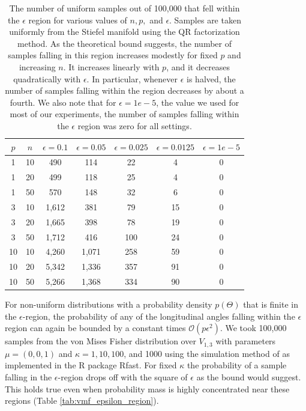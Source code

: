\documentclass[ba]{imsart}
\numberwithin{equation}{section}
\theoremstyle{plain}
\begin{document}
\begin{table}
\begin{tabular}{|cc||ccccc|}
\hline
$p$ & $n$  & $\epsilon = 0.1$ & $\epsilon = 0.05$ & $\epsilon = 0.025$ & $\epsilon = 0.0125$ & $\epsilon = 1e-5$\\
\hline
\hline
1 & 10 & 490 & 114 & 22 & 4 & 0\\
1 & 20 & 499 & 118 & 25 & 4 & 0\\
1 & 50 & 570 & 148 & 32 & 6 & 0 \\
\hline
3 & 10 & 1,612 & 381 & 79  & 15 & 0\\
3 & 20 & 1,665 & 398 & 78 & 19 & 0\\
3 & 50 & 1,712 & 416 & 100  & 24 & 0\\
\hline
10 & 10 & 4,260 & 1,071 & 258 & 59 & 0\\
10 & 20 & 5,342 & 1,336 & 357 & 91 & 0\\
10 & 50 & 5,266 & 1,368 & 334 & 90 & 0 \\
\hline
\end{tabular}
\caption{The number of uniform samples out of 100,000 that fell within the $\epsilon$ region for various values of $n, p,$ and $\epsilon$. Samples are taken uniformly from the Stiefel manifold using the QR factorization method. As the theoretical bound suggests, the number of samples falling in this region increases modestly for fixed $p$ and increasing $n$. It increases linearly with $p$, and it decreases quadratically with $\epsilon$. In particular, whenever $\epsilon$ is halved, the number of samples falling within the region decreases by about a fourth. We also note that for $\epsilon = 1e-5$, the value we used for most of our experiments, the number of samples falling within the $\epsilon$ region was zero for all settings.}
\label{tab:uniform_epsilon_region}
\end{table}

\noindent For non-uniform distributions with a probability density $p(\Theta)$ that is finite in the $\epsilon$-region, the probability of any of the longitudinal angles falling within the $\epsilon$ region can again be bounded by a constant times $\mathcal{O}(p \epsilon^2)$. We took 100,000 samples from the von Mises Fisher distribution over $V_{1,3}$ with parameters $\mu = (0,0,1)$ and $\kappa = 1, 10, 100$, and 1000 using the simulation method of \citet{wood1994simulation} as implemented in the R package Rfast. For fixed $\kappa$ the probability of a sample falling in the $\epsilon$-region drops off with the square of $\epsilon$ as the bound would suggest. This holds true even when probability mass is highly concentrated near these regions (Table \ref{tab:vmf_epsilon_region}).  
\end{document}
